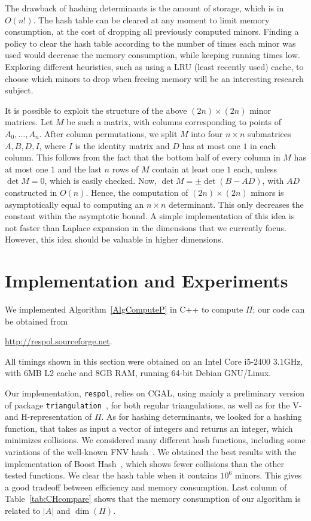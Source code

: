 \documentclass{article}
\begin{document}
The drawback of hashing determinants is the amount of storage, which 
is in \(O(n!)\).
The hash table can be cleared at any moment to limit memory consumption, at
the cost of dropping all previously computed minors. Finding a policy
to clear the hash table according to the number of times each minor was
used would decrease the memory consumption, while keeping running times
low.
Exploring different heuristics, such as using a LRU (least recently used)
cache, to choose which minors to drop when freeing memory will be an
interesting research subject.

It is possible to exploit the structure of the above $(2n)\times(2n)$ minor
matrices. Let $M$ be such a matrix, with
columns corresponding to points of $A_0,\dots,A_n$.
After column permutations, we split $M$ into four $n\times n$
submatrices $A,B,D, I$, where $I$ is the identity matrix 
and $D$ has at most one $1$ in each column.
This follows from the fact that the bottom half of every column in $M$
has at most one $1$ and the last $n$ rows of $M$ contain at least
one $1$ each, unless $\det M=0$, which is easily checked.
Now, $\det M=\pm \det(B-AD)$, with $AD$ constructed in $O(n)$.
Hence, the computation of $(2n)\times(2n)$ minors
is asymptotically equal to computing 
an $n\times n$ determinant. 
This only decreases the constant within the asymptotic bound.
A simple implementation of this idea is not faster than Laplace expansion in
the dimensions that we currently focus.  However, this idea should be valuable
in higher dimensions.


\section{Implementation and Experiments} \label{Simplement}

We implemented Algorithm~\ref{AlgComputeP} in C++ to compute $\varPi$; our code
can be obtained from 
\begin{center}
 \url{http://respol.sourceforge.net}. 
\end{center}
All timings shown in this section were obtained on an Intel Core i5-2400
$3.1$GHz, with $6$MB L2 cache and $8$GB RAM, running 64-bit Debian
GNU/Linux.

Our implementation, {\tt respol}, relies on CGAL, using mainly a
preliminary version of package {\tt triangulation}~, 
for both regular
triangulations, as well as for the V- and H-representation of $\varPi$.
As for hashing determinants, we looked for a hashing function, that takes
as input a vector of integers and returns an integer, which
minimizes collisions.
We considered many different hash functions, including some variations of
the well-known FNV hash~.
We obtained the best results with the implementation of Boost
Hash~, which shows fewer collisions than the other tested
functions.
We clear the hash table when it contains $10^6$ minors. This gives a good
tradeoff between efficiency and memory consumption. Last column of
Table~\ref{tab:CHcompare} shows that the memory consumption of our
algorithm is related to $|A|$ and $\dim(\varPi)$.
\end{document}
